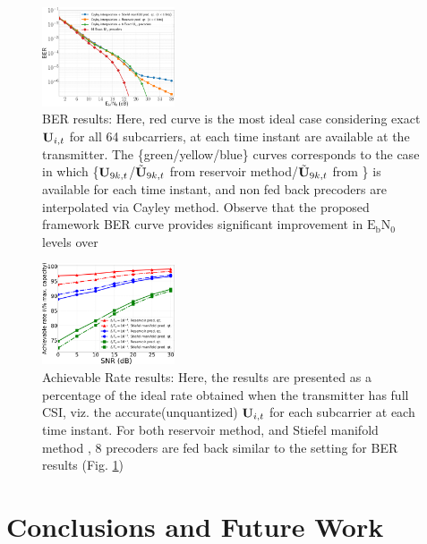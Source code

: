 \documentclass[conference]{IEEEtran}
\begin{document}
{\begin{figure}
\centering
\includegraphics[width=0.35\textwidth]{images/BER_res.pdf}
\vspace{-5pt}
\caption{BER results: Here, red curve is the most ideal case considering exact ${\bf U}_{i,t}$ for all 64 subcarriers, at each time instant are available at the transmitter. The \{green/yellow/blue\} curves corresponds to the case in which \{${\bf U}_{9k,t}$/$\tilde{{\bf U}}_{9k,t}$ from reservoir method/$\tilde{{\bf U}}_{9k,t}$ from \cite{6891198}\} is available for each time instant, and non fed back precoders are interpolated via Cayley method. Observe that the proposed framework BER curve provides significant improvement in $\text{E}_\text{b}\text{N}_0$ levels over \cite{6891198}}
\vspace{5pt}
\label{BER}
\end{figure}

\begin{figure}
\centering
\includegraphics[width=0.35\textwidth]{images/hopRate.pdf}
\vspace{-5pt}
\caption{Achievable Rate results: Here, the results are presented as a percentage of the ideal rate obtained when the transmitter has full CSI, viz. the accurate(unquantized) ${\bf U}_{i,t}$ for each subcarrier at each time instant. For both reservoir method, and Stiefel manifold method \cite{6891198}, 8 precoders are fed back similar to the setting for BER results (Fig. \ref{BER})}
\label{achievrate}
\vspace{-10pt}
\end{figure}

\section{Conclusions and Future Work}
\label{section5}

}
\end{document}

